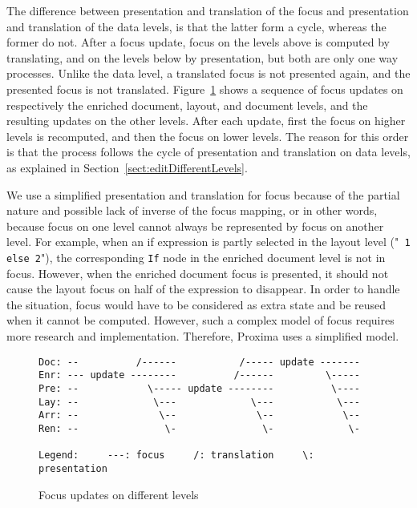 The difference between presentation and translation of the focus and presentation and translation of the data levels, is that the latter form a cycle, whereas the former do not. After a focus update, focus on the levels above is computed by translating, and on the levels below by presentation, but both are only one way processes. Unlike the data level, a translated focus is not presented again, and the presented focus is not translated. Figure~\ref{focusUpdates} shows a sequence of focus updates on respectively the enriched document, layout, and document levels, and the resulting updates on the other levels. After each update, first the focus on higher levels is recomputed, and then the focus on lower levels. The reason for this order is that the process follows the cycle of presentation and translation on data levels, as explained in Section~\ref{sect:editDifferentLevels}.


We use a simplified presentation and translation for focus because of  the partial nature and possible lack of inverse of the focus mapping, or in other words, because focus on one level cannot always be represented by focus on another level. For example, when an if expression is partly selected in the layout level ("{\tt {}\verb| 1 else 2|}"), the corresponding \verb|If| node in the enriched document level is not in focus. However, when the enriched document focus is presented, it should not cause the layout focus on half of the expression to disappear. In order to handle the situation, focus would have to be considered as extra state and be reused when it cannot be computed. However, such a complex model of focus requires more research and implementation. Therefore, Proxima uses a simplified model.  

\begin{figure}
\begin{small}
\begin{center}
\begin{verbatim}
Doc: --          /------           /----- update -------
Enr: --- update --------          /------         \-----
Pre: --            \----- update --------          \----
Lay: --             \---             \---           \---
Arr: --              \--              \--            \--
Ren: --               \-               \-             \-

Legend:     ---: focus     /: translation     \: presentation
\end{verbatim}
\caption{Focus updates on different levels}\label{focusUpdates} 
\end{center}
\end{small}
\end{figure}


